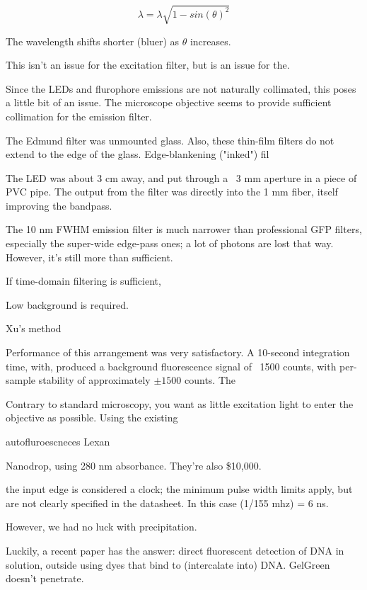 \documentclass[paper.tex]{subfiles}
\begin{document}
$$\lambda = \lambda \sqrt{1-sin(\theta)^2}$$

The wavelength shifts shorter (bluer) as $\theta$ increases.

This isn't an issue for the excitation filter, but is an issue for the.

Since the LEDs and flurophore emissions are not naturally collimated, this poses a little bit of an issue.
The microscope objective seems to provide sufficient collimation for the emission filter.

The Edmund filter was unmounted glass. Also, these thin-film filters do not extend to the edge of the glass. Edge-blankening ("inked") fil



The LED was about 3 cm away, and put through a ~3 mm aperture in a piece of PVC pipe. The output from the filter was directly into the 1 mm fiber, itself improving the bandpass.





The 10 nm FWHM emission filter is much narrower than professional GFP filters, especially the super-wide edge-pass ones; a lot of photons are lost that way. However, it's still more than sufficient. 






If time-domain filtering is sufficient, 

Low background is required.

Xu's method \cite{Quantification2020}

Performance of this arrangement was very satisfactory. A 10-second integration time, with, produced a background fluorescence signal of ~1500 counts, with per-sample stability of approximately $\pm 1500$ counts. The  



Contrary to standard microscopy, you want as little excitation light to enter the objective as possible. Using the existing 

autofluroescneces Lexan

Nanodrop, using 280 nm absorbance. They're also \$10,000.




the input edge is considered a clock; the minimum pulse width limits apply, but are not clearly specified in the datasheet. In this case (1/155 mhz) = 6 ns.

However, we had no luck with precipitation.


Luckily, a recent paper has the answer: direct fluorescent detection of DNA in solution, outside using dyes that bind to (intercalate into) DNA. GelGreen doesn’t penetrate.
\end{document}
